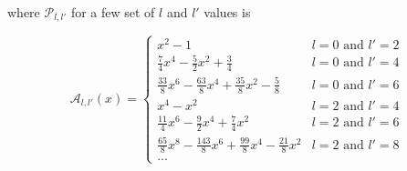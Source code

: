 where $\mathcal{P}_{l, l'}$ for a few set of $l$ and $l'$ values is
\begin{spacing}{1.5}
\[
\mathcal{A}_{l, l'} (x) =
\begin{cases} 
x^2-1   &l = 0 \text{ and } l'= 2 \\
\frac{7}{4}x^4 - \frac{5}{2} x^2 + \frac{3}{4}  
&l = 0 \text{ and } l'= 4 \\
\frac{33}{8} x^6 - \frac{63}{8}x^4 + \frac{35}{8}x^2 - \frac{5}{8}  
&l = 0 \text{ and } l'= 6 \\
x^4 - x^2
&l = 2 \text{ and } l'= 4 \\
\frac{11}{4}x^6 - \frac{9}{2}x^4 + \frac{7}{4}x^2
&l = 2 \text{ and } l'= 6 \\
\frac{65}{8}x^8 - \frac{143}{8}x^6 + \frac{99}{8}x^4 - \frac{21}{8}x^2
&l = 2 \text{ and } l'= 8 \\
...
\end{cases}
\]
\end{spacing}


